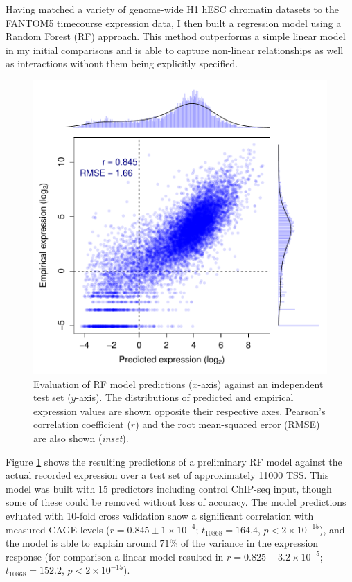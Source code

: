 \documentclass[a4paper,11pt,oneside]{book}
\begin{document}
Having matched a variety of genome-wide H1 hESC chromatin datasets
to the FANTOM5 timecourse expression data, I then built a regression
model using a Random Forest (RF) approach.\cite{Breiman2001} This method outperforms a simple
linear model in my initial comparisons and is able to capture non-linear relationships as well
as interactions without them being explicitly specified.\cite{Diaz2006}

\begin{figure}
\begin{center} 
\includegraphics[width=.6\textwidth]{figs/RandomForest_10CV_50d.pdf}
\captionsetup{width=\textwidth} 
\caption{Evaluation of RF model predictions ($x$-axis) against an independent
  test set ($y$-axis). The distributions of predicted and empirical
  expression values are shown opposite their
  respective axes. Pearson's correlation coefficient ($r$) and the root
  mean-squared error (RMSE) are also shown (\emph{inset}).
}\label{fig:model}
\end{center} 
\end{figure} 

Figure \ref{fig:model} shows the resulting predictions of a
preliminary RF model against the actual recorded expression over a
test set of approximately 11000 TSS. This model was built with 15
predictors including control ChIP-seq input, though some of these could be
removed without loss of accuracy. The model predictions evluated with
10-fold cross validation show a
significant correlation with measured CAGE levels ($ r = 0.845\pm
1 \times 10^{-4}$; $t_{10868} = 164.4$,
$p < 2 \times 10^{-15}$), and the model is able to explain around
$71\%$ of the variance in the expression response (for comparison a
linear model resulted in $r = 0.825 \pm 3.2 \times 10^{-5}$; $t_{10868} = 152.2$,
$p < 2 \times 10^{-15}$).
\end{document}
